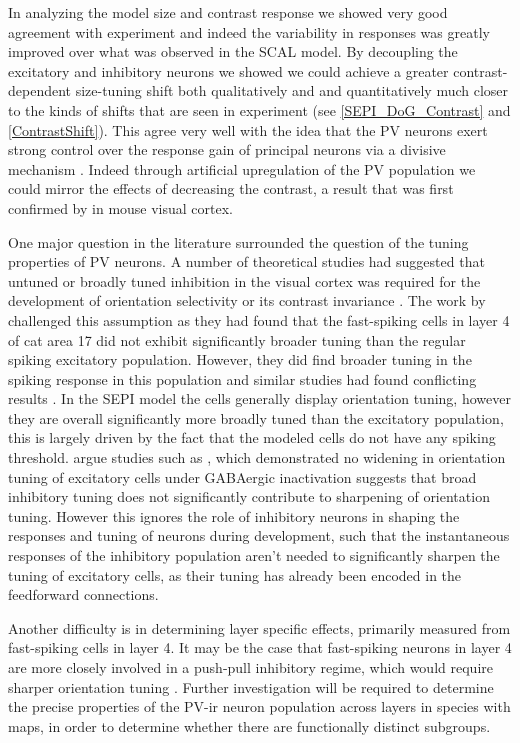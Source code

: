 In analyzing the model size and contrast response we showed very good
agreement with experiment and indeed the variability in responses was
greatly improved over what was observed in the SCAL model. By
decoupling the excitatory and inhibitory neurons we showed we could
achieve a greater contrast-dependent size-tuning shift both
qualitatively and and quantitatively much closer to the kinds of
shifts that are seen in experiment (see \ref{SEPI_DoG_Contrast} and
\ref{ContrastShift}). This agree very well with the idea that the PV
neurons exert strong control over the response gain of principal
neurons via a divisive mechanism \citep{Wilson2012}. Indeed through
artificial upregulation of the PV population we could mirror the
effects of decreasing the contrast, a result that was first confirmed
by \cite{Nienborg2013} in mouse visual cortex.

One major question in the literature surrounded the question of the
tuning properties of PV neurons. A number of theoretical studies had
suggested that untuned or broadly tuned inhibition in the visual
cortex was required for the development of orientation selectivity or
its contrast invariance \citep{Somers1995, Troyer1998}. The work by
\cite{Cardin2007} challenged this assumption as they had found that
the fast-spiking cells in layer 4 of cat area 17 did not exhibit
significantly broader tuning than the regular spiking excitatory
population. However, they did find broader tuning in the spiking
response in this population and similar studies had found conflicting
results \citep{Hirsch2003, Nowak2008}. In the SEPI model the cells
generally display orientation tuning, however they are overall
significantly more broadly tuned than the excitatory population, this
is largely driven by the fact that the modeled cells do not have any
spiking threshold. \cite{Cardin2007} argue studies such as
\cite{Nelson1994}, which demonstrated no widening in orientation
tuning of excitatory cells under GABAergic inactivation suggests that
broad inhibitory tuning does not significantly contribute to
sharpening of orientation tuning. However this ignores the role of
inhibitory neurons in shaping the responses and tuning of neurons
during development, such that the instantaneous responses of the
inhibitory population aren't needed to significantly sharpen the
tuning of excitatory cells, as their tuning has already been encoded
in the feedforward connections.

Another difficulty is in determining layer specific effects,
\cite{Cardin2007} primarily measured from fast-spiking cells in layer
4. It may be the case that fast-spiking neurons in layer 4 are more
closely involved in a push-pull inhibitory regime, which would require
sharper orientation tuning \citep{Hirsch2003, Hirsch2006a}. Further
investigation will be required to determine the precise properties of
the PV-ir neuron population across layers in species with maps, in
order to determine whether there are functionally distinct subgroups.

